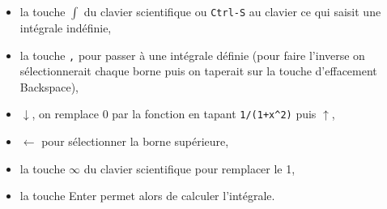 \documentclass[a4paper,11pt]{article}
\begin{document}
\begin{itemize}
\item la touche $\int$ du clavier scientifique ou {\tt Ctrl-S} au
clavier ce qui saisit une int\'egrale ind\'efinie,
\item la touche \verb|,| pour passer \`a une int\'egrale d\'efinie (pour
faire l'inverse on s\'electionnerait chaque borne puis on taperait sur
la touche d'effacement Backspace),
\item $\downarrow$, on remplace 0 par la fonction en tapant
\verb|1/(1+x^2)| puis $\uparrow$,
\item $\leftarrow$ pour s\'electionner la borne sup\'erieure,
\item la touche $\infty$ du clavier scientifique pour remplacer le 1,
\item la touche Enter permet alors de calculer l'int\'egrale.
\end{itemize}
\end{document}
